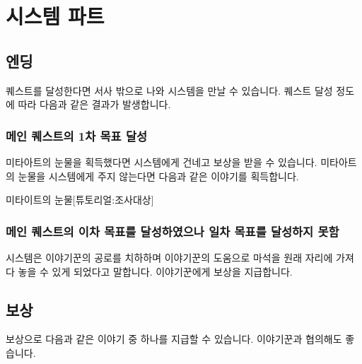 \documentclass{report}
\begin{document}
	\section{시스템 파트}
		\subsection{엔딩}
			퀘스트를 달성한다면 서사 밖으로 나와 시스템을 만날 수 있습니다. 퀘스트 달성 정도에 따라 다음과 같은 결과가 발생합니다.
			
			\subsubsection*{메인 퀘스트의 1차  목표 달성}
				미타아트의 눈물을 획득했다면 시스템에게 건네고 보상을 받을 수 있습니다. 미타아트의 눈물을 시스템에게 주지 않는다면 다음과 같은 이야기를 획득합니다.
				
				\begin{spoiler}{미타이트의 눈물}{[튜토리얼:조사대상]}
				\end{spoiler}
				
			\subsubsection*{메인 퀘스트의 이차 목표를 달성하였으나 일차 목표를 달성하지 못함}
				시스템은 이야기꾼의 공로를 치하하며 이야기꾼의 도움으로 마석을 원래 자리에 가져다 놓을 수 있게 되었다고 말합니다. 이야기꾼에게 보상을 지급합니다.
		\subsection{보상}
			보상으로 다음과 같은 이야기 중 하나를 지급할 수 있습니다. 이야기꾼과 협의해도 좋습니다.
\end{document}
